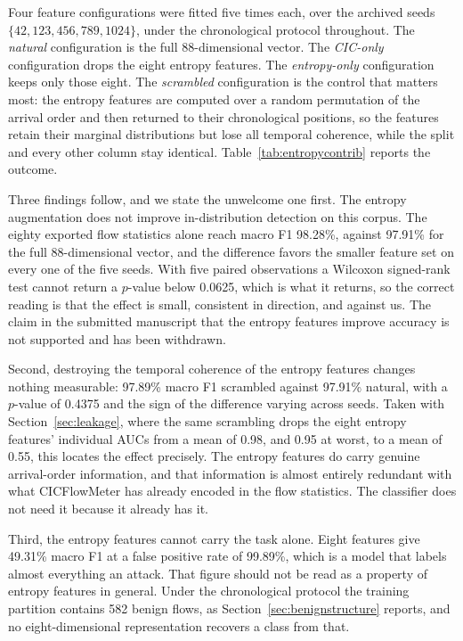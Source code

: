 \documentclass{ieeeaccess}
\begin{document}
Four feature configurations were fitted five times each, over the archived seeds
$\{42, 123, 456, 789, 1024\}$, under the chronological protocol throughout. The
\emph{natural} configuration is the full 88-dimensional vector. The
\emph{CIC-only} configuration drops the eight entropy features. The
\emph{entropy-only} configuration keeps only those eight. The \emph{scrambled}
configuration is the control that matters most: the entropy features are
computed over a random permutation of the arrival order and then returned to
their chronological positions, so the features retain their marginal
distributions but lose all temporal coherence, while the split and every other
column stay identical. Table~\ref{tab:entropycontrib} reports the outcome.

Three findings follow, and we state the unwelcome one first. The entropy
augmentation does not improve in-distribution detection on this corpus. The
eighty exported flow statistics alone reach macro F1 98.28\%, against 97.91\%
for the full 88-dimensional vector, and the difference favors the smaller
feature set on every one of the five seeds. With five paired observations a
Wilcoxon signed-rank test cannot return a $p$-value below 0.0625, which is what
it returns, so the correct reading is that the effect is small, consistent in
direction, and against us. The claim in the submitted manuscript that the
entropy features improve accuracy is not supported and has been withdrawn.

Second, destroying the temporal coherence of the entropy features changes
nothing measurable: 97.89\% macro F1 scrambled against 97.91\% natural, with a
$p$-value of 0.4375 and the sign of the difference varying across seeds. Taken
with Section~\ref{sec:leakage}, where the same scrambling drops the eight entropy
features' individual AUCs from a mean of 0.98, and 0.95 at worst, to a mean of
0.55, this locates the effect precisely. The entropy features do carry genuine arrival-order information, and
that information is almost entirely redundant with what CICFlowMeter has already
encoded in the flow statistics. The classifier does not need it because it
already has it.

Third, the entropy features cannot carry the task alone. Eight features give
49.31\% macro F1 at a false positive rate of 99.89\%, which is a model that
labels almost everything an attack. That figure should not be read as a property
of entropy features in general. Under the chronological protocol the training
partition contains 582 benign flows, as Section~\ref{sec:benignstructure}
reports, and no eight-dimensional representation recovers a class from that.
\end{document}
